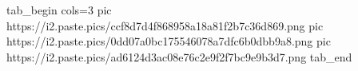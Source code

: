  
 
 
 
 

\ifcmt
  tab_begin cols=3
     pic https://i2.paste.pics/ccf8d7d4f868958a18a81f2b7c36d869.png
		 pic https://i2.paste.pics/0dd07a0bc175546078a7dfc6b0dbb9a8.png
		 pic https://i2.paste.pics/ad6124d3ac08e76c2e9f2f7bc9e9b3d7.png
  tab_end
\fi
